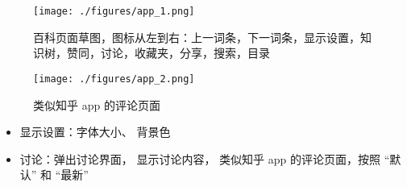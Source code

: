 
\begin{figure}[ht]
\centering
\texttt{[image: ./figures/app\_1.png]}
\caption{百科页面草图，图标从左到右：上一词条，下一词条，显示设置，知识树，赞同，讨论，收藏夹，分享，搜索，目录} \label{app_fig1}
\end{figure}

\begin{figure}[ht]
\centering
\texttt{[image: ./figures/app\_2.png]}
\caption{类似知乎 app 的评论页面} \label{app_fig2}
\end{figure}

\begin{itemize}
\item 显示设置：字体大小、 背景色
\item 讨论：弹出讨论界面， 显示讨论内容， 类似知乎 app 的评论页面，按照 “默认” 和 “最新” 
\end{itemize}
